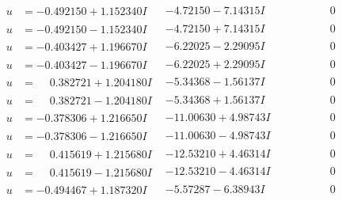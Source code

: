 \documentclass[1p]{elsarticle_modified}
\theoremstyle{definition}
\begin{document}
$$\begin{array}{c|c|c}
\begin{aligned}
u &= -0.492150 + 1.152340 I\end{aligned}
 & -4.72150 - 7.14315 I & \phantom{-0.000000 } 0 \\ \hline\begin{aligned}
u &= -0.492150 - 1.152340 I\end{aligned}
 & -4.72150 + 7.14315 I & \phantom{-0.000000 } 0 \\ \hline\begin{aligned}
u &= -0.403427 + 1.196670 I\end{aligned}
 & -6.22025 - 2.29095 I & \phantom{-0.000000 } 0 \\ \hline\begin{aligned}
u &= -0.403427 - 1.196670 I\end{aligned}
 & -6.22025 + 2.29095 I & \phantom{-0.000000 } 0 \\ \hline\begin{aligned}
u &= \phantom{-}0.382721 + 1.204180 I\end{aligned}
 & -5.34368 - 1.56137 I & \phantom{-0.000000 } 0 \\ \hline\begin{aligned}
u &= \phantom{-}0.382721 - 1.204180 I\end{aligned}
 & -5.34368 + 1.56137 I & \phantom{-0.000000 } 0 \\ \hline\begin{aligned}
u &= -0.378306 + 1.216650 I\end{aligned}
 & -11.00630 + 4.98743 I & \phantom{-0.000000 } 0 \\ \hline\begin{aligned}
u &= -0.378306 - 1.216650 I\end{aligned}
 & -11.00630 - 4.98743 I & \phantom{-0.000000 } 0 \\ \hline\begin{aligned}
u &= \phantom{-}0.415619 + 1.215680 I\end{aligned}
 & -12.53210 + 4.46314 I & \phantom{-0.000000 } 0 \\ \hline\begin{aligned}
u &= \phantom{-}0.415619 - 1.215680 I\end{aligned}
 & -12.53210 - 4.46314 I & \phantom{-0.000000 } 0 \\ \hline\begin{aligned}
u &= -0.494467 + 1.187320 I\end{aligned}
 & -5.57287 - 6.38943 I & \phantom{-0.000000 } 0 \\ \hline\begin{aligned}

\end{aligned}
\end{array}$$
\end{document}
